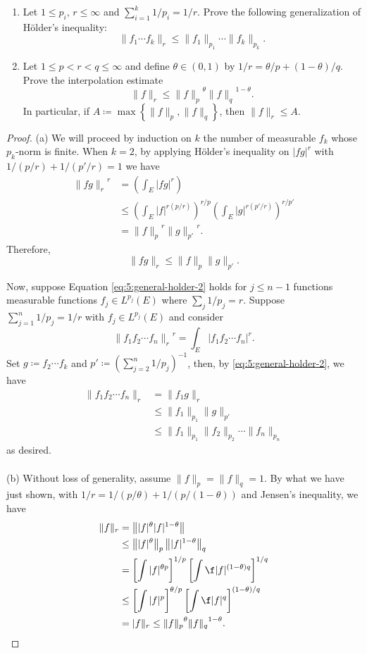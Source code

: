 \begin{problem}
\begin{enumerate}[label=(\alph*)]
\item Let $1\leq p_i$, $r\leq\infty$ and $\sum_{i=1}^k1/p_i=1/r$. Prove the
  following generalization of Hölder's inequality:
\[
\|f_1\dotsm f_k\|_r\leq\|f_1\|_{p_1}\dotsm\|f_k\|_{p_k}.
\]
\item Let $1\leq p<r<q\leq\infty$ and define $\theta\in(0,1)$ by
  $1/r=\theta/p+(1-\theta)/q$. Prove the interpolation estimate
\[
\|f\|_r\leq{\|f\|_p}^\theta{\|f\|_q}^{1-\theta}.
\]
In particular, if $A\coloneqq\max\left\{\|f\|_p,\|f\|_q\right\}$, then
$\|f\|_r\leq A$.
\end{enumerate}
\end{problem}
\begin{proof}
(a) We will proceed by induction on $k$ the number of measurable $f_k$
whose $p_k$-norm is finite. When $k=2$, by applying Hölder's inequality on
$|fg|^r$ with $1/(p/r)+1/(p'/r)=1$ we have
\begin{align*}
{\|fg\|_r}^r
&=\left(\int_E|fg|^r\right)\\
&\leq\left(\int_E|f|^{r(p/r)}\right)^{r/p}\left(\int_E|g|^{r(p'/r)}\right)^{r/p'}\\
&={\|f\|_p}^r{\|g\|_{p'}}^r.
\end{align*}
Therefore,
\begin{equation}
  \label{eq:5:general-holder-2}
{\|fg\|_r}\leq\|f\|_p\|g\|_{p'}.
\end{equation}

Now, suppose Equation \eqref{eq:5:general-holder-2} holds for $j\leq n-1$
functions measurable functions $f_j\in L^{p_j}(E)$ where
$\sum_j1/p_j=r$. Suppose $\sum_{j=1}^n1/p_j=1/r$ with $f_j\in L^{p_j}(E)$
and consider
\[
{\|f_1f_2\dotsm f_n\|_r}^r=\int_E|f_1f_2\dotsm
f_n|^r.
\]
Set $g\coloneqq f_2\dotsm f_k$ and
$p'\coloneqq\left(\sum_{j=2}^n1/p_j\right)^{-1}$, then, by
\eqref{eq:5:general-holder-2}, we have
\begin{align*}
\|f_1f_2\dotsm f_n\|_r
&=\|f_1g\|_r\\
&\leq\|f_1\|_{p_1}\|g\|_{p'}\\
&\leq\|f_1\|_{p_1}\|f_2\|_{p_2}\dotsm\|f_n\|_{p_n}
\end{align*}
as desired.
\\\\
(b) Without loss of generality, assume $\|f\|_p=\|f\|_q=1$. By what we have
just shown, with $1/r=1/(p/\theta)+1/(p/(1-\theta))$ and Jensen's
inequality, we have
\[
\begin{aligned}
\|f\|_r&=\left\||f|^\theta |f|^{1-\theta}\right\|\\
&\leq\left\||f|^\theta\right\|_p\left\||f|^{1-\theta}\right\|_q\\
&=\left[\int |f|^{\theta
    p}\right]^{1/p}\left[\int\f|f|^{(1-\theta)q}\right]^{1/q}\\
&\leq\left[\int |f|^{p}\right]^{\theta/p}\left[\int\f|f|^q\right]^{(1-\theta)/q}\\
&=|f\|_r\leq{\|f\|_p}^\theta{\|f\|_q}^{1-\theta}.
\end{aligned}
\]
\end{proof}
\newpage

